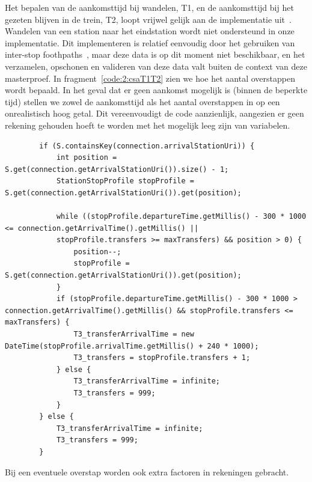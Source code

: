 Het bepalen van de aankomsttijd bij wandelen, T1, en de aankomsttijd bij het gezeten blijven in de trein, T2, loopt vrijwel gelijk aan de implementatie uit~\cite{strasser17}. Wandelen van een station naar het eindstation wordt niet ondersteund in onze implementatie. Dit implementeren is relatief eenvoudig door het gebruiken van inter-stop foothpaths~\citep{strasser17,hannemann08}, maar deze data is op dit moment niet beschikbaar, en het verzamelen, opschonen en valideren van deze data valt buiten de context van deze masterproef. In fragment~\ref{code:2:csaT1T2} zien we hoe het aantal overstappen wordt bepaald. In het geval dat er geen aankomst mogelijk is (binnen de beperkte tijd) stellen we zowel de aankomsttijd als het aantal overstappen in op een onrealistisch hoog getal. Dit vereenvoudigt de code aanzienlijk, aangezien er geen rekening gehouden hoeft te worden met het mogelijk leeg zijn van variabelen.

\begin{listing}[htb]
	\begin{verbatim}
		if (S.containsKey(connection.arrivalStationUri)) {
			int position = S.get(connection.getArrivalStationUri()).size() - 1;
			StationStopProfile stopProfile = S.get(connection.getArrivalStationUri()).get(position);
			
			while ((stopProfile.departureTime.getMillis() - 300 * 1000 <= connection.getArrivalTime().getMillis() ||
			stopProfile.transfers >= maxTransfers) && position > 0) {
				position--;
				stopProfile = S.get(connection.getArrivalStationUri()).get(position);
			}
			if (stopProfile.departureTime.getMillis() - 300 * 1000 > connection.getArrivalTime().getMillis() && stopProfile.transfers <= maxTransfers) {
				T3_transferArrivalTime = new DateTime(stopProfile.arrivalTime.getMillis() + 240 * 1000);
				T3_transfers = stopProfile.transfers + 1;
			} else {
				T3_transferArrivalTime = infinite;
				T3_transfers = 999;
			}
		} else {
			T3_transferArrivalTime = infinite;
			T3_transfers = 999;
		}
		\end{verbatim}
		\caption[CSA: Bepalen van aankomsttijden]{Bij een eventuele overstap worden ook extra factoren in rekeningen gebracht.}
		\label{code:2:csaT3}
\end{listing}

